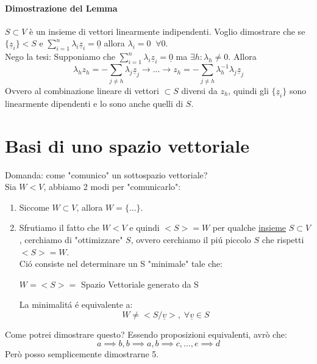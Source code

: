 \paragraph{Dimostrazione del Lemma}
$S\subset V$ è un insieme di vettori linearmente indipendenti.
Voglio dimostrare che se $\{\underline{z}_i \}<S$ e $\sum_{i=1}^{n} \lambda_i \underline{z}_i = \underline{0}$ allora $\lambda_i=0 \;\; \forall 0$.
\\Nego la tesi: Supponiamo che  $\sum_{i=1}^{n} \lambda_i \underline{z}_i = \underline{0}$ ma $\exists h : \lambda_h \neq 0$.
Allora 
\[\lambda_h z_h = -\sum_{j\neq h} \lambda_j \underline{z}_j \to ... \to z_h = -\sum_{j\neq h} \lambda_h^{-1} \lambda_j \underline{z}_j\]
Ovvero al combinazione lineare di vettori $\subset S$ diversi da $z_h$, quindi gli $\{\underline{z}_i \}$ sono linearmente dipendenti e lo sono anche quelli di $S$.


\section{Basi di uno spazio vettoriale}
Domanda: come "comunico" un sottospazio vettoriale?
\\Sia $W<V$, abbiamo 2 modi per "comunicarlo":
\begin{enumerate}
    \item Siccome $W\subset V$, allora $W=\{...\}$.
    \item Sfrutiamo il fatto che $W<V$ e quindi $<S>=W$ per qualche \underline{insieme} $S\subset V$,
    cerchiamo di "ottimizzare" $S$, ovvero cerchiamo il piú piccolo $S$ che rispetti $<S>=W$.
    \\Ció consiste nel determinare un S "minimale" tale che:
    \begin{center}
        $W = <S> =$ Spazio Vettoriale generato da S
    \end{center}
    La minimalitá é equivalente a:
    \[ W\neq <S/\underline{v}>, \; \forall \underline{v} \in S \]
\end{enumerate}

Come potrei dimostrare questo?
Essendo proposizioni equivalenti, avrò che:
\[ a \implies b, b\implies a, b \implies c, ... , e\implies d\]
Però posso semplicemente dimostrarne 5. %

